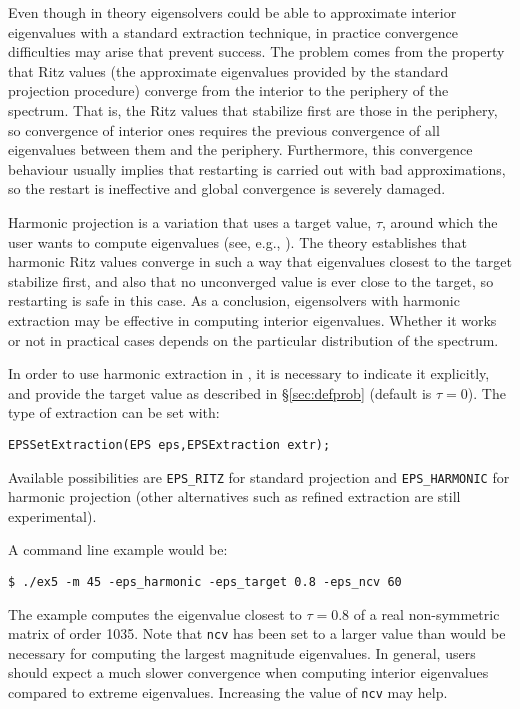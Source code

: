 Even though in theory eigensolvers could be able to approximate interior eigenvalues with a standard extraction technique, in practice convergence difficulties may arise that prevent success. The problem comes from the property that Ritz values (the approximate eigenvalues provided by the standard projection procedure) converge from the interior to the periphery of the spectrum. That is, the Ritz values that stabilize first are those in the periphery, so convergence of interior ones requires the previous convergence of all eigenvalues between them and the periphery. Furthermore, this convergence behaviour usually implies that restarting is carried out with bad approximations, so the restart is ineffective and global convergence is severely damaged.

Harmonic projection is a variation that uses a target value, $\tau$, around which the user wants to compute eigenvalues (see, e.g., \citep{Morgan:2006:HRA}). The theory establishes that harmonic Ritz values converge in such a way that eigenvalues closest to the target stabilize first, and also that no unconverged value is ever close to the target, so restarting is safe in this case. As a conclusion, eigensolvers with harmonic extraction may be effective in computing interior eigenvalues. Whether it works or not in practical cases depends on the particular distribution of the spectrum.

In order to use harmonic extraction in \slepc, it is necessary to indicate it explicitly, and provide the target value as described in \S\ref{sec:defprob} (default is $\tau=0$). The type of extraction can be set with:
	\begin{Verbatim}[fontsize=\small]
	EPSSetExtraction(EPS eps,EPSExtraction extr);
	\end{Verbatim}
Available possibilities are \texttt{EPS\_RITZ} for standard projection and \texttt{EPS\_HARMONIC} for harmonic projection (other alternatives such as refined extraction are still experimental).

A command line example would be:
	\begin{Verbatim}[fontsize=\small]
	$ ./ex5 -m 45 -eps_harmonic -eps_target 0.8 -eps_ncv 60
	\end{Verbatim}
The example computes the eigenvalue closest to $\tau=0.8$ of a real non-symmetric matrix of order 1035. Note that \texttt{ncv} has been set to a larger value than would be necessary for computing the largest magnitude eigenvalues. In general, users should expect a much slower convergence when computing interior eigenvalues compared to extreme eigenvalues. Increasing the value of \texttt{ncv} may help.

